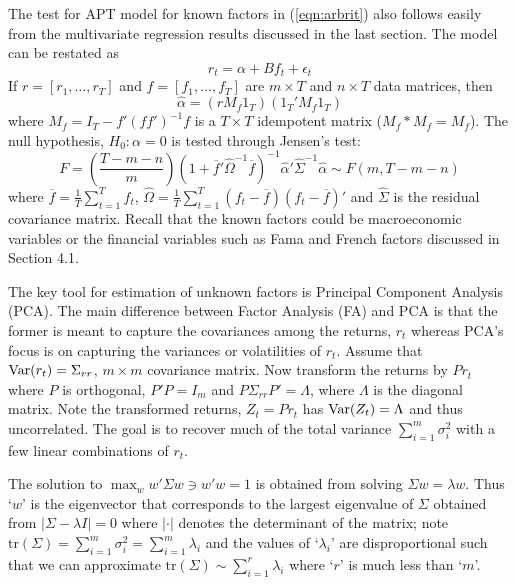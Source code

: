 The test for APT model for known factors in (\ref{eqn:arbrit}) also follows easily from the multivariate regression results discussed in the last section. The model can be restated as
	\begin{equation}\label{eqn:5rtalpha}
	r_t = \alpha + B f_t + \epsilon_t
	\end{equation}
If $r=[r_1,\ldots,r_T]$ and $f=[f_1,\ldots,f_T]$ are $m \times T$ and $n \times T$ data matrices, then
	\begin{equation}\label{eqn:5hatalpha}
	\hat{\alpha}=(rM_f 1_T)(1_T' M_f1_T)
	\end{equation}	
where $M_f=I_T - f'(ff')^{-1}f$ is a $T \times T$ idempotent matrix ($M_f * M_f=M_f$). The null hypothesis, $H_0: \alpha=0$ is tested through Jensen's test:
	\begin{equation}\label{eqn:bigF}
	F= \left(\dfrac{T-m-n}{m}\right) (1+\overline{f}' \hat{\Omega}^{-1} \overline{f})^{-1} \hat{\alpha}' \hat{\Sigma}^{-1} \hat{\alpha} \sim F(m,T-m-n)
	\end{equation}	
where $\overline{f}=\frac{1}{T} \sum_{t=1}^T f_t$, $\hat{\Omega}=\frac{1}{T} \sum_{t=1}^T (f_t - \overline{f})(f_t - \overline{f})'$ and $\hat{\Sigma}$ is the residual covariance matrix. Recall that the known factors could be macroeconomic variables or the financial variables such as Fama and French factors discussed in Section 4.1.


The key tool for estimation of unknown factors is Principal Component Analysis (PCA). The main difference between Factor Analysis (FA) and PCA is that the former is meant to capture the covariances among the returns, $r_t$ whereas PCA's focus is on capturing the variances or volatilities of $r_t$. Assume that $\operatorname{Var}(r_t)=\Sigma_{rr}$, $m\times m$ covariance matrix. Now transform the returns by $Pr_t$ where $P$ is orthogonal, $P'P=I_m$ and $P\Sigma_{rr}P'=\Lambda$, where $\Lambda$ is the diagonal matrix. Note the transformed returns, $Z_t=Pr_t$ has $\operatorname{Var}(Z_t)=\Lambda$ and thus uncorrelated. The goal is to recover much of the total variance $\sum_{i=1}^m \sigma_i^2$ with a few linear combinations of $r_t$. 


\begin{result}\label{res:nextres}
The solution to $\max_w w' \Sigma w \ni w'w=1$ is obtained from solving $\Sigma w=\lambda w$. Thus `$w$' is the eigenvector that corresponds to the largest eigenvalue of $\Sigma$ obtained from $|\Sigma- \lambda I|=0$ where $|\cdot|$ denotes the determinant of the matrix; note $\text{tr}(\Sigma)= \sum_{i=1}^m \sigma_i^2 = \sum_{i=1}^m \lambda_i$ and the values of `$\lambda_i$' are disproportional such that we can approximate $\text{tr}(\Sigma) \sim \sum_{i=1}^r \lambda_i$ where `$r$' is much less than `$m$'. 
\end{result}	
	
